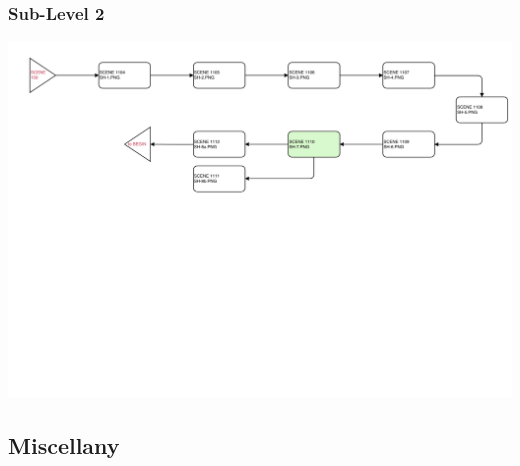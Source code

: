 \documentclass{article}
\begin{document}
		\subsubsection{Sub-Level 2}
			\begin{center}
				\includegraphics[scale=0.6, angle=90]{LevelProgSH.png}
			\end{center}
		\newpage
	\subsection{Miscellany} 

\end{document}
